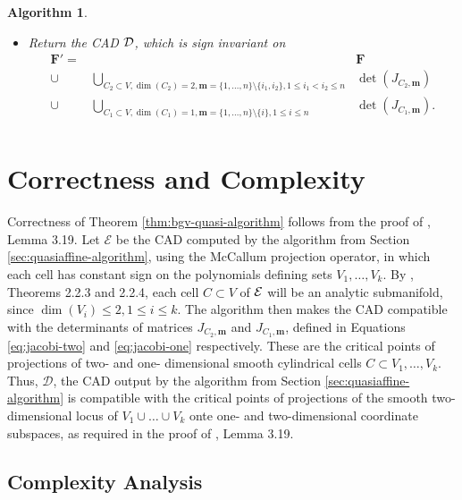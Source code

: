 \documentclass[
]{book}
\providecommand{\tightlist}{%
  \setlength{\itemsep}{0pt}\setlength{\parskip}{0pt}}
\newtheorem{algorithm}{Algorithm}
\theoremstyle{definition}
\theoremstyle{definition}
\theoremstyle{definition}
\theoremstyle{definition}
\theoremstyle{remark}
\begin{document}
\begin{algorithm}
\begin{itemize}
  \begin{itemize}
  \tightlist
  \item
    Return the CAD \(\cal D\), which is sign invariant on
    \begin{align*}
    \mathbf{F}' =\ & & \mathbf{F}\\
    \cup\ & \bigcup_{C_2 \subset V,\dim(C_2) = 2,\mathbf{m} = \{1,\ldots,n\} \setminus \{i_1,i_2\}, 1 \le i_1 < i_2 \le n} & \det\left(J_{C_2,\mathbf{m}}\right)\\
    \cup\ & \bigcup_{C_1 \subset V,\dim(C_1) = 1,\mathbf{m} = \{1,\ldots,n\} \setminus \{i\}, 1 \le i \le n} & \det\left(J_{C_1,\mathbf{m}}\right).\\
    \end{align*}
  \end{itemize}
\end{itemize}

\end{algorithm}

\hypertarget{correctness-and-complexity}{%
\section{Correctness and Complexity}\label{correctness-and-complexity}}

Correctness of Theorem \ref{thm:bgv-quasi-algorithm} follows from the proof of \citet{bgv15}, Lemma 3.19. Let \(\mathcal{E}\) be the CAD computed by the algorithm from Section \ref{sec:quasiaffine-algorithm}, using the McCallum projection operator, in which each cell has constant sign on the polynomials defining sets \(V_1,\ldots,V_k\).
By \citet{mccallum1988}, Theorems 2.2.3 and 2.2.4, each cell \(C \subset V\) of \(\cal E\) will be an analytic submanifold, since \(\dim(V_i) \le 2, 1\le i \le k\).
The algorithm then makes the CAD compatible with the determinants of matrices \(J_{C_2,\mathbf{m}}\) and \(J_{C_1,\mathbf{m}}\), defined in Equations \eqref{eq:jacobi-two} and \eqref{eq:jacobi-one} respectively. These are the critical points of projections of two- and one- dimensional smooth cylindrical cells \(C \subset V_1,\ldots,V_k\). Thus, \(\mathcal{D}\), the CAD output by the algorithm from Section \ref{sec:quasiaffine-algorithm} is compatible with the critical points of projections of the smooth two-dimensional locus of \(V_1\cup \ldots \cup V_k\) onte one- and two-dimensional coordinate subspaces, as required in the proof of \citet{bgv15}, Lemma 3.19.

\hypertarget{sec:quasi-complexity}{%
\subsection{Complexity Analysis}\label{sec:quasi-complexity}}
\end{document}
